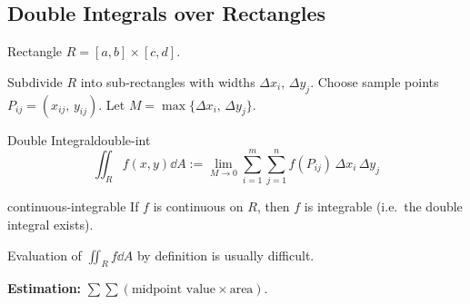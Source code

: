 \subsection{Double Integrals over Rectangles}

Rectangle $R = [a,b]\times[c,d]$.

\begin{center}
\end{center}

\begin{center}
\end{center}

Subdivide $R$ into sub-rectangles with widths $\Delta x_i$, $\Delta y_j$.
Choose sample points $P_{ij} = (x_{ij},\, y_{ij})$.
Let $M = \max\{\Delta x_i,\, \Delta y_j\}$.

\begin{definition}{Double Integral}{double-int}
  \[
    \iint_R f(x,y)\dd{A}
    := \lim_{M\to 0}\sum_{i=1}^{m}\sum_{j=1}^{n} f(P_{ij})\,\Delta x_i\,\Delta y_j
  \]
\end{definition}

\begin{theorem}{}{continuous-integrable}
  If $f$ is continuous on $R$, then $f$ is integrable (i.e.\ the double integral exists).
\end{theorem}

Evaluation of $\iint_R f\dd{A}$ by definition is usually difficult.

\textbf{Estimation:} $\displaystyle\sum\sum(\text{midpoint value}\times\text{area})$.


